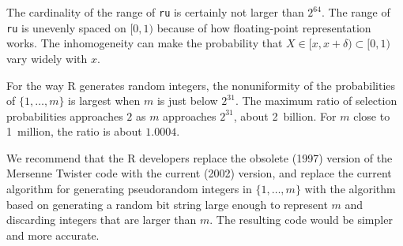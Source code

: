\documentclass[12pt]{article}
\begin{document}
The cardinality of the range of \texttt{ru} is certainly not larger than $2^{64}$.
The range of \texttt{ru} is unevenly spaced on $[0, 1)$
because of how floating-point representation works.
The inhomogeneity can make the probability that $X \in [x, x+\delta) \subset [0, 1)$
vary widely with $x$.

For the way R generates random integers, the nonuniformity of the probabilities of 
$\{1, \ldots, m\}$ is largest when $m$ is just below $2^{31}$. 
The maximum ratio of selection probabilities approaches $2$ as $m$
approaches $2^{31}$, about 2~billion. 
For $m$ close to 1~million, the ratio is about $1.0004$.

We recommend that the R developers replace the obsolete (1997) version of the Mersenne Twister code with the current (2002) version, and replace the current algorithm for generating 
pseudorandom integers in $\{1, \ldots, m\}$ with the algorithm based on generating a random bit string large enough to represent $m$ and discarding integers that are larger than $m$.
The resulting code would be simpler and more accurate. 



\end{document}
